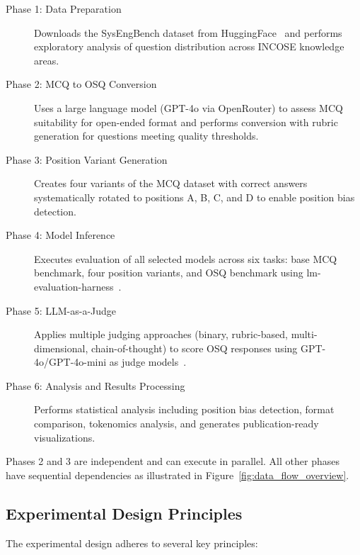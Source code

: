 \begin{description}
    \item[Phase 1: Data Preparation] Downloads the SysEngBench dataset from HuggingFace~\citep{sysengbench_citation} and performs exploratory analysis of question distribution across INCOSE knowledge areas.

    \item[Phase 2: MCQ to OSQ Conversion] Uses a large language model (GPT-4o via OpenRouter) to assess MCQ suitability for open-ended format and performs conversion with rubric generation for questions meeting quality thresholds.

    \item[Phase 3: Position Variant Generation] Creates four variants of the MCQ dataset with correct answers systematically rotated to positions A, B, C, and D to enable position bias detection.

    \item[Phase 4: Model Inference] Executes evaluation of all selected models across six tasks: base MCQ benchmark, four position variants, and OSQ benchmark using lm-evaluation-harness~\citep{lm_eval_harness}.

    \item[Phase 5: LLM-as-a-Judge] Applies multiple judging approaches (binary, rubric-based, multi-dimensional, chain-of-thought) to score OSQ responses using GPT-4o/GPT-4o-mini as judge models~\citep{zheng2023judging}.

    \item[Phase 6: Analysis and Results Processing] Performs statistical analysis including position bias detection, format comparison, tokenomics analysis, and generates publication-ready visualizations.
\end{description}

Phases 2 and 3 are independent and can execute in parallel. All other phases have sequential dependencies as illustrated in Figure~\ref{fig:data_flow_overview}.

\subsection{Experimental Design Principles}

The experimental design adheres to several key principles:

